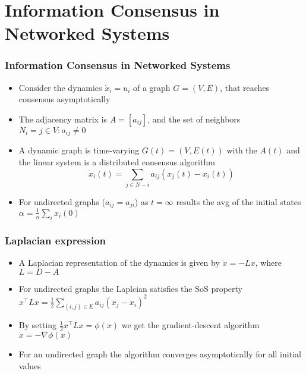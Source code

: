 \documentclass{beamer}
\begin{document}
\section{Information Consensus in Networked Systems}

\begin{frame}
\frametitle{Information Consensus in Networked Systems}
\begin{itemize}
\item Consider the dynamics $\dot{x}_i=u_i$ of a graph $G=(V,E)$, that reaches consensus asymptotically
\item The adjacency matrix is $A=[a_{ij}]$, and the set of neighbors $N_i = {j \in V : a_{ij}\ne 0}$
\item A dynamic graph is time-varying $G(t)=(V,E(t))$ with the $A(t)$ and the linear system is a distributed consensus algorithm
\begin{equation*}
\dot{x}_i(t) = \sum_{j \in N-i}a_{ij}(x_j(t)-x_i(t))
\end{equation*}
\item For undirected graphs ($a_{ij}=a_{ji}$) as $t=\infty$ results the avg of the initial states $\alpha=\frac{1}{n}\sum_i x_i(0)$
\end{itemize}
\end{frame}


\begin{frame}
\frametitle{Laplacian expression}
\begin{itemize}
\item A Laplacian representation of the dynamics is given by $\dot{x} = -Lx$, where $L=D-A$ \vspace{.2cm}
\item For undirected graphs the Laplcian satisfies the SoS property $x^{\intercal}Lx=\frac{1}{2}\sum_{(i,j)\in E}a_{ij}(x_j-x_i)^2$ \vspace{.2cm}
\item By setting $\frac{1}{2}x^{\intercal}Lx=\phi(x)$ we get the gradient-descent algorithm $\dot{x}=-\nabla \phi(x)$ \vspace{.2cm}
\item For an undirected graph the algorithm converges asymptotically for all initial values
\end{itemize}
\end{frame}

\end{document}
